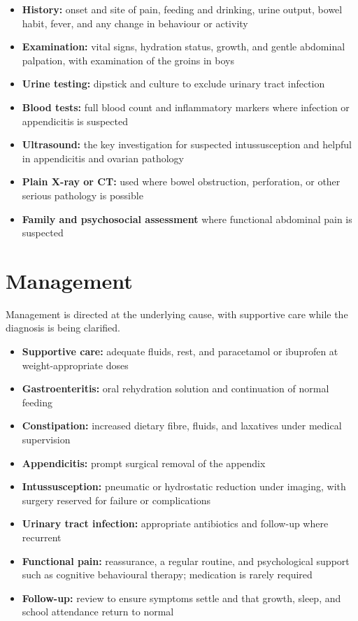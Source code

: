 \begin{itemize}
    \item \textbf{History:} onset and site of pain, feeding and drinking, urine output, bowel habit, fever, and any change in behaviour or activity
    \item \textbf{Examination:} vital signs, hydration status, growth, and gentle abdominal palpation, with examination of the groins in boys
    \item \textbf{Urine testing:} dipstick and culture to exclude urinary tract infection
    \item \textbf{Blood tests:} full blood count and inflammatory markers where infection or appendicitis is suspected
    \item \textbf{Ultrasound:} the key investigation for suspected intussusception and helpful in appendicitis and ovarian pathology
    \item \textbf{Plain X-ray or CT:} used where bowel obstruction, perforation, or other serious pathology is possible
    \item \textbf{Family and psychosocial assessment} where functional abdominal pain is suspected
\end{itemize}

\section*{Management}
Management is directed at the underlying cause, with supportive care while the diagnosis is being clarified.

\begin{itemize}
    \item \textbf{Supportive care:} adequate fluids, rest, and paracetamol or ibuprofen at weight-appropriate doses
    \item \textbf{Gastroenteritis:} oral rehydration solution and continuation of normal feeding
    \item \textbf{Constipation:} increased dietary fibre, fluids, and laxatives under medical supervision
    \item \textbf{Appendicitis:} prompt surgical removal of the appendix
    \item \textbf{Intussusception:} pneumatic or hydrostatic reduction under imaging, with surgery reserved for failure or complications
    \item \textbf{Urinary tract infection:} appropriate antibiotics and follow-up where recurrent
    \item \textbf{Functional pain:} reassurance, a regular routine, and psychological support such as cognitive behavioural therapy; medication is rarely required
    \item \textbf{Follow-up:} review to ensure symptoms settle and that growth, sleep, and school attendance return to normal
\end{itemize}

